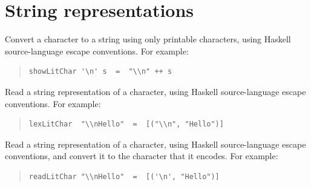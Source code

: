 \section{String representations}
\begin{haddockdesc}
\item[\begin{tabular}{@{}l}
showLitChar :: Char -> ShowS
\end{tabular}]
{\haddockbegindoc
Convert a character to a string using only printable characters,
 using Haskell source-language escape conventions.  For example:\par
\begin{quote}
{\haddockverb\begin{verbatim}
showLitChar '\n' s  =  "\\n" ++ s\end{verbatim}}
\end{quote}}
\end{haddockdesc}
\begin{haddockdesc}
\item[\begin{tabular}{@{}l}
lexLitChar :: ReadS String
\end{tabular}]
{\haddockbegindoc
Read a string representation of a character, using Haskell
 source-language escape conventions.  For example:\par
\begin{quote}
{\haddockverb\begin{verbatim}
lexLitChar  "\\nHello"  =  [("\\n", "Hello")]\end{verbatim}}
\end{quote}}
\end{haddockdesc}
\begin{haddockdesc}
\item[\begin{tabular}{@{}l}
readLitChar :: ReadS Char
\end{tabular}]
{\haddockbegindoc
Read a string representation of a character, using Haskell
 source-language escape conventions, and convert it to the character
 that it encodes.  For example:\par
\begin{quote}
{\haddockverb\begin{verbatim}
readLitChar "\\nHello"  =  [('\n', "Hello")]\end{verbatim}}
\end{quote}}
\end{haddockdesc}